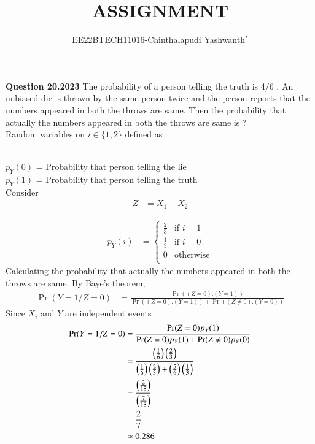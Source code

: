 \documentclass[journal,12pt,twocolumn]{IEEEtran}
\theoremstyle{remark}
\begin{document}

\vspace{3cm}

\title{ASSIGNMENT}
\author{EE22BTECH11016-Chinthalapudi Yashwanth$^{*}$%
}
\maketitle
\newpage
\bigskip
\renewcommand{\thefigure}{\theenumi}
\renewcommand{\thetable}{\theenumi}

\textbf{Question 20.2023}
The probability of a person telling the truth is 4/6 . An unbiased die is thrown by
the same person twice and the person reports that the numbers appeared in both
the throws are same. Then the probability that actually the numbers appeared in
both the throws are same is ?\\
\solution
Random variables on $i \in \{1,2\} $ defined as
\begin{table}[!ht]
	
\end{table}\\
$p_Y(0)$ = Probability that person telling the lie\\
$p_Y(1)$ = Probability that person telling the truth\\
Consider
\begin{align}
Z&=X_1-X_2
\end{align}
\begin{table}[!ht]
	
\end{table}
\begin{align}
p_Y(i) &= \begin{cases}
	    \frac{2}{3} & \text{if } i = 1\\
	    \frac{1}{3} & \text{if } i = 0\\
	    0 & \text{otherwise}\\
          \end{cases}
\end{align}
Calculating the probability that actually the numbers appeared in
both the throws are same.
By Baye's theorem, 
\begin{align} 
\Pr(Y=1 / Z=0) &= \frac{\Pr((Z=0) . (Y=1))}{\Pr((Z=0) .( Y=1)) + \Pr((Z \ne 0) . (Y=0))}
\end{align}
Since $X_i$ and $Y$ are independent events
\begin{align}
\Pr(Y=1 / Z=0) &= \frac{\Pr(Z=0)p_Y(1)}{\Pr(Z=0)p_Y(1) + \Pr(Z \ne 0)p_Y(0)}\\
             &= \frac{\left(\frac{1}{6}\right) \left(\frac{2}{3}\right)}{\left(\frac{1}{6}\right) \left(\frac{2}{3}\right) + \left(\frac{5}{6}\right) \left(\frac{1}{3}\right)}\\
&= \frac{\left(\frac{2}{18}\right)}{\left(\frac{7}{18}\right)}\\
&= \frac{2}{7}\\
&\approx 0.286
\end{align}
\end{document}

